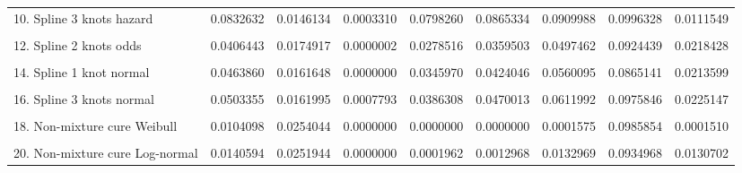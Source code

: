 \documentclass[]{article}
\begin{document}
\begin{table}
{\begin{tabular}[t]{lrrrrrrrr}
10. Spline 3 knots hazard & 0.0832632 & 0.0146134 & 0.0003310 & 0.0798260 & 0.0865334 & 0.0909988 & 0.0996328 & 0.0111549\\
\cellcolor{gray!6}{11. Spline 1 knot odds} & \cellcolor{gray!6}{0.0410014} & \cellcolor{gray!6}{0.0174571} & \cellcolor{gray!6}{0.0000002} & \cellcolor{gray!6}{0.0281269} & \cellcolor{gray!6}{0.0363823} & \cellcolor{gray!6}{0.0502992} & \cellcolor{gray!6}{0.0917044} & \cellcolor{gray!6}{0.0221203}\\
12. Spline 2 knots odds & 0.0406443 & 0.0174917 & 0.0000002 & 0.0278516 & 0.0359503 & 0.0497462 & 0.0924439 & 0.0218428\\
\cellcolor{gray!6}{13. Spline 3 knots odds} & \cellcolor{gray!6}{0.0497623} & \cellcolor{gray!6}{0.0176792} & \cellcolor{gray!6}{0.0003253} & \cellcolor{gray!6}{0.0358147} & \cellcolor{gray!6}{0.0466608} & \cellcolor{gray!6}{0.0638606} & \cellcolor{gray!6}{0.0999099} & \cellcolor{gray!6}{0.0279854}\\
14. Spline 1 knot normal & 0.0463860 & 0.0161648 & 0.0000000 & 0.0345970 & 0.0424046 & 0.0560095 & 0.0865141 & 0.0213599\\
\cellcolor{gray!6}{15. Spline 2 knots normal} & \cellcolor{gray!6}{0.0400250} & \cellcolor{gray!6}{0.0171948} & \cellcolor{gray!6}{0.0000006} & \cellcolor{gray!6}{0.0281480} & \cellcolor{gray!6}{0.0348987} & \cellcolor{gray!6}{0.0473455} & \cellcolor{gray!6}{0.0953359} & \cellcolor{gray!6}{0.0191484}\\
16. Spline 3 knots normal & 0.0503355 & 0.0161995 & 0.0007793 & 0.0386308 & 0.0470013 & 0.0611992 & 0.0975846 & 0.0225147\\
\cellcolor{gray!6}{17. Mixture cure Weibull} & \cellcolor{gray!6}{0.0103115} & \cellcolor{gray!6}{0.0253657} & \cellcolor{gray!6}{0.0000000} & \cellcolor{gray!6}{0.0000000} & \cellcolor{gray!6}{0.0000000} & \cellcolor{gray!6}{0.0001031} & \cellcolor{gray!6}{0.0987558} & \cellcolor{gray!6}{0.0000986}\\
18. Non-mixture cure Weibull & 0.0104098 & 0.0254044 & 0.0000000 & 0.0000000 & 0.0000000 & 0.0001575 & 0.0985854 & 0.0001510\\
\cellcolor{gray!6}{19. Mixture cure Log-normal} & \cellcolor{gray!6}{0.0135710} & \cellcolor{gray!6}{0.0252751} & \cellcolor{gray!6}{0.0000000} & \cellcolor{gray!6}{0.0000929} & \cellcolor{gray!6}{0.0008027} & \cellcolor{gray!6}{0.0116086} & \cellcolor{gray!6}{0.0931907} & \cellcolor{gray!6}{0.0114404}\\
20. Non-mixture cure Log-normal & 0.0140594 & 0.0251944 & 0.0000000 & 0.0001962 & 0.0012968 & 0.0132969 & 0.0934968 & 0.0130702\\

\end{tabular}}
\end{table}
\end{document}
